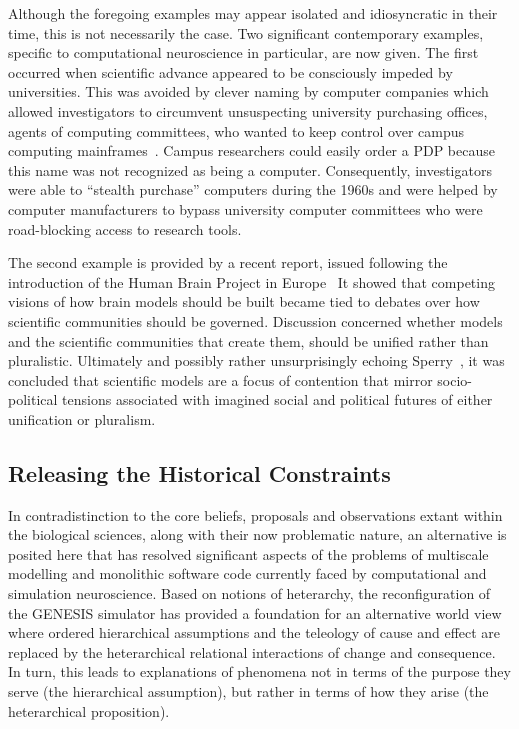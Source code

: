 \documentclass[10pt,letterpaper]{article}
\begin{document}
Although the foregoing examples may appear isolated and idiosyncratic in their time, this is not necessarily the case. Two significant contemporary examples, specific to  computational neuroscience in particular, are now given. The first occurred when scientific advance appeared to be consciously impeded by universities. This was avoided by clever naming by computer companies which allowed investigators to circumvent unsuspecting university purchasing offices, agents of computing committees, who wanted to keep control over campus computing mainframes~\cite{Moore:2010vn}. Campus researchers could easily order a PDP because this name was not recognized as being a computer. Consequently, investigators were able to “stealth purchase” computers during the 1960s and were helped by computer manufacturers to bypass university computer committees who were road-blocking access to research tools.

The second example is provided by a recent report, issued following the introduction of the Human Brain Project in Europe~\cite{mahfoud21} It showed that competing visions of how brain models should be built became tied to debates over how scientific communities should be governed. Discussion concerned whether models and the scientific communities that create them, should be unified rather than pluralistic. Ultimately and possibly rather unsurprisingly echoing Sperry~\cite{sperry80}, it was concluded that scientific models are a focus of contention that mirror socio-political tensions associated with imagined social and political futures of either unification or pluralism.


\subsection*{Releasing the Historical Constraints}

In contradistinction to the core beliefs, proposals and observations extant within the biological sciences, along with their now problematic nature, an alternative is posited here that has resolved significant aspects of the problems of multiscale modelling and monolithic software code currently faced by computational and simulation neuroscience. Based on notions of heterarchy, the reconfiguration of the GENESIS simulator has provided a foundation for an alternative world view where ordered hierarchical assumptions and the teleology of cause and effect are replaced by the heterarchical relational interactions of change and consequence. In turn, this leads to explanations of phenomena not in terms of the purpose they serve (the hierarchical assumption), but rather in terms of how they arise (the heterarchical proposition).
\end{document}
